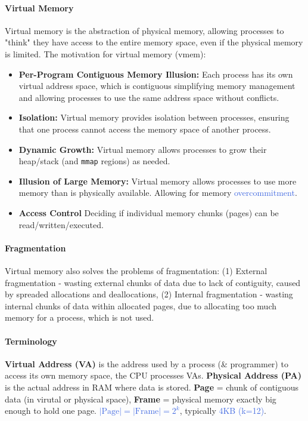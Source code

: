 \documentclass[openany,12pt]{book}
\newcommand{\code}[1]{\texttt{#1}}
\newcommand{\blue}[1]{\textcolor{RoyalBlue}{#1}}
\begin{document}
\paragraph{Virtual Memory} Virtual memory is the abstraction of physical memory, allowing processes to "think" they have access to the entire memory space, even if the physical memory is limited. The motivation for virtual memory (vmem): 
\begin{itemize}
  \item \textbf{Per-Program Contiguous Memory Illusion:} Each process has its own virtual address space, which is contiguous simplifying memory management and allowing processes to use the same address space without conflicts.
  
  \item \textbf{Isolation:} Virtual memory provides isolation between processes, ensuring that one process cannot access the memory space of another process. 
  
  \item \textbf{Dynamic Growth:} Virtual memory allows processes to grow their heap/stack (and \code{mmap} regions) as needed.
  
  \item \textbf{Illusion of Large Memory:} Virtual memory allows processes to use more memory than is physically available. Allowing for memory \blue{overcommitment}. 
  
  \item \textbf{Access Control} Deciding if individual memory chunks (pages) can be read/written/executed.
\end{itemize}


\paragraph{Fragmentation} Virtual memory also solves the problems of fragmentation: (1) External fragmentation - wasting external chunks of data due to lack of contiguity, caused by spreaded allocations and deallocations, (2) Internal fragmentation - wasting internal chunks of data within allocated pages, due to allocating too much memory for a process, which is not used.


\paragraph{Terminology} \textbf{Virtual Address (VA)} is the address used by a process (\& programmer) to access its own memory space, the CPU processes VAs. \textbf{Physical Address (PA)} is the actual address in RAM where data is stored. \textbf{Page} = chunk of contiguous data (in virutal or physical space), \textbf{Frame} = physical memory exactly big enough to hold one page. \blue{\(|\text{Page}|=|\text{Frame}|=2^k\)}, typically \blue{4KB (k=12)}.
\end{document}
